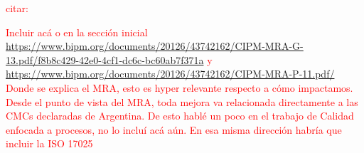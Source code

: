 \textcolor{red}{citar: \cite{frascati,osloManual,pmbok2021guide}}

\textcolor{red}{Incluir acá o en la sección inicial \url{https://www.bipm.org/documents/20126/43742162/CIPM-MRA-G-13.pdf/f8b8c429-42e0-4cf1-dc6c-bc60ab7f371a} y \url{https://www.bipm.org/documents/20126/43742162/CIPM-MRA-P-11.pdf/} Donde se explica el MRA, esto es hyper relevante respecto a cómo impactamos. Desde el punto de vista del MRA, toda mejora va relacionada directamente a las CMCs declaradas de Argentina. De esto hablé un poco en el trabajo de Calidad enfocada a procesos, no lo incluí acá aún. En esa misma dirección habría que incluir la ISO 17025 }




